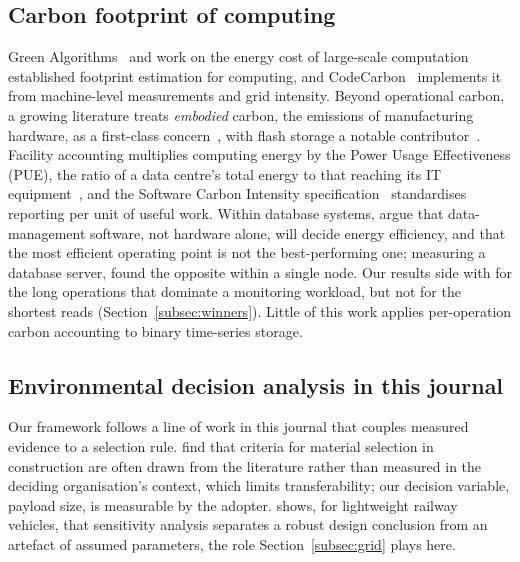 \documentclass[pdflatex,sn-basic]{sn-jnl}%
\begin{document}
\subsection{Carbon footprint of computing}\label{subsec:carbonlit}
{\color{markup}Green Algorithms~\citep{lannelongue_green_algorithms} and work on the energy cost of large-scale computation~\citep{strubell_energy_nlp} established footprint estimation for computing, and CodeCarbon~\citep{codecarbon} implements it from machine-level measurements and grid intensity.} {\color{markup}Beyond operational carbon, a growing literature treats \emph{embodied} carbon, the emissions of manufacturing hardware, as a first-class concern~\citep{gupta_chasing_carbon}, with flash storage a notable contributor~\citep{tannu_ssd_embodied}.} {\color{markup}Facility accounting multiplies computing energy by the Power Usage Effectiveness (PUE), the ratio of a data centre's total energy to that reaching its IT equipment~\citep{shehabi_us_datacenter,masanet_datacenter_energy}, and the Software Carbon Intensity specification~\citep{gsf_sci} standardises reporting per unit of useful work.} {\color{markup}Within database systems, \citet{harizopoulos_energy_dbms} argue that data-management software, not hardware alone, will decide energy efficiency, and that the most efficient operating point is not the best-performing one; measuring a database server, \citet{tsirogiannis_db_server_energy} found the opposite within a single node.} {\color{markup}Our results side with \citet{tsirogiannis_db_server_energy} for the long operations that dominate a monitoring workload, but not for the shortest reads (Section~\ref{subsec:winners}).} {\color{markup}Little of this work applies per-operation carbon accounting to binary time-series storage.}

\subsection{Environmental decision analysis in this journal}\label{subsec:esd}
{\color{markup}Our framework follows a line of work in this journal that couples measured evidence to a selection rule.} {\color{markup}\citet{bajwa_material_selection_mcdm} find that criteria for material selection in construction are often drawn from the literature rather than measured in the deciding organisation's context, which limits transferability; our decision variable, payload size, is measurable by the adopter.} {\color{markup}\citet{kraft_lca_railway_sensitivity} shows, for lightweight railway vehicles, that sensitivity analysis separates a robust design conclusion from an artefact of assumed parameters, the role Section~\ref{subsec:grid} plays here.}
\end{document}
